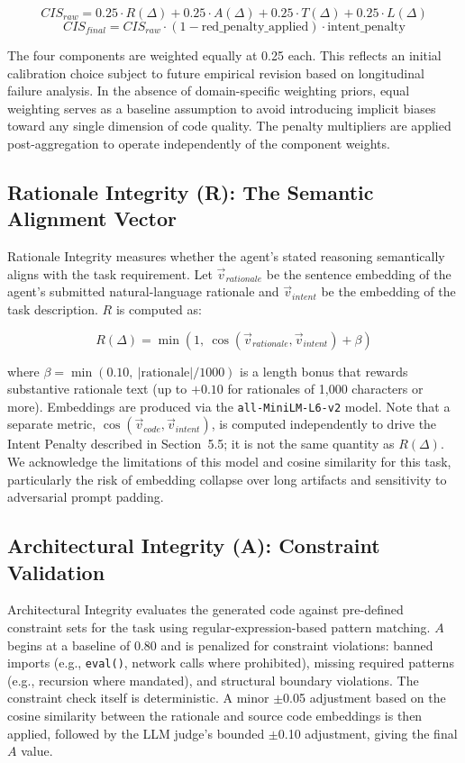 \documentclass[11pt, a4paper]{article}
\begin{document}
\[
CIS_{raw} = 0.25 \cdot R(\Delta) + 0.25 \cdot A(\Delta) + 0.25 \cdot T(\Delta) + 0.25 \cdot L(\Delta)
\]
\[
CIS_{final} = CIS_{raw} \cdot (1 - \text{red\_penalty\_applied}) \cdot \text{intent\_penalty}
\]

The four components are weighted equally at 0.25 each. This reflects an initial calibration choice subject to future empirical revision based on longitudinal failure analysis. In the absence of domain-specific weighting priors, equal weighting serves as a baseline assumption to avoid introducing implicit biases toward any single dimension of code quality. The penalty multipliers are applied post-aggregation to operate independently of the component weights.

\subsection{Rationale Integrity (R): The Semantic Alignment Vector}

Rationale Integrity measures whether the agent's stated reasoning semantically aligns with the task requirement. Let $\vec{v}_{rationale}$ be the sentence embedding of the agent's submitted natural-language rationale and $\vec{v}_{intent}$ be the embedding of the task description. $R$ is computed as:

\[
R(\Delta) = \min\!\left(1,\ \cos(\vec{v}_{rationale}, \vec{v}_{intent}) + \beta\right)
\]

where $\beta = \min(0.10,\ |\text{rationale}| / 1000)$ is a length bonus that rewards substantive rationale text (up to $+0.10$ for rationales of 1{,}000 characters or more). Embeddings are produced via the \texttt{all-MiniLM-L6-v2} model. Note that a separate metric, $\cos(\vec{v}_{code}, \vec{v}_{intent})$, is computed independently to drive the Intent Penalty described in Section~5.5; it is not the same quantity as $R(\Delta)$. We acknowledge the limitations of this model and cosine similarity for this task, particularly the risk of embedding collapse over long artifacts and sensitivity to adversarial prompt padding.

\subsection{Architectural Integrity (A): Constraint Validation}

Architectural Integrity evaluates the generated code against pre-defined constraint sets for the task using regular-expression-based pattern matching. $A$ begins at a baseline of 0.80 and is penalized for constraint violations: banned imports (e.g., \texttt{eval()}, network calls where prohibited), missing required patterns (e.g., recursion where mandated), and structural boundary violations. The constraint check itself is deterministic. A minor $\pm$0.05 adjustment based on the cosine similarity between the rationale and source code embeddings is then applied, followed by the LLM judge's bounded $\pm$0.10 adjustment, giving the final $A$ value.
\end{document}
